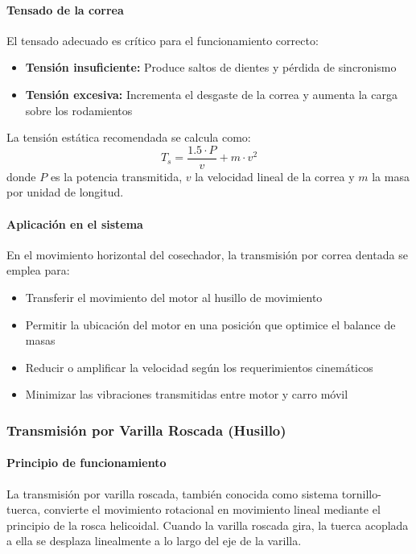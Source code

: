 \paragraph{Tensado de la correa}
El tensado adecuado es crítico para el funcionamiento correcto:
\begin{itemize}
    \item \textbf{Tensión insuficiente:} Produce saltos de dientes y pérdida de sincronismo
    \item \textbf{Tensión excesiva:} Incrementa el desgaste de la correa y aumenta la carga sobre los rodamientos
\end{itemize}

La tensión estática recomendada se calcula como:
\begin{equation}
    T_s = \frac{1.5 \cdot P}{v} + m \cdot v^2
\end{equation}
donde $P$ es la potencia transmitida, $v$ la velocidad lineal de la correa y $m$ la masa por unidad de longitud.

\paragraph{Aplicación en el sistema}
En el movimiento horizontal del cosechador, la transmisión por correa dentada se emplea para:
\begin{itemize}
    \item Transferir el movimiento del motor al husillo de movimiento
    \item Permitir la ubicación del motor en una posición que optimice el balance de masas
    \item Reducir o amplificar la velocidad según los requerimientos cinemáticos
    \item Minimizar las vibraciones transmitidas entre motor y carro móvil
\end{itemize}

\subsubsection{Transmisión por Varilla Roscada (Husillo)}

\paragraph{Principio de funcionamiento}
La transmisión por varilla roscada, también conocida como sistema tornillo-tuerca, convierte el movimiento rotacional en movimiento lineal mediante el principio de la rosca helicoidal. Cuando la varilla roscada gira, la tuerca acoplada a ella se desplaza linealmente a lo largo del eje de la varilla.

